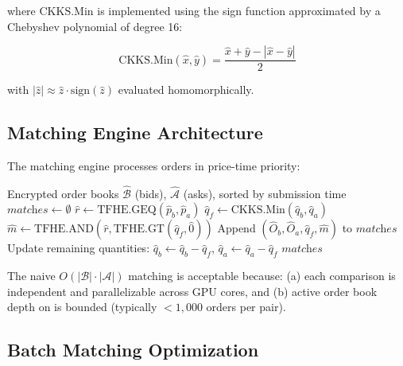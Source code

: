 where $\text{CKKS.Min}$ is implemented using the sign function approximated by a Chebyshev polynomial of degree 16:

\begin{equation}
\text{CKKS.Min}(\hat{x}, \hat{y}) = \frac{\hat{x} + \hat{y} - |\hat{x} - \hat{y}|}{2}
\end{equation}

with $|\hat{z}| \approx \hat{z} \cdot \text{sign}(\hat{z})$ evaluated homomorphically.

\subsection{Matching Engine Architecture}

The matching engine processes orders in price-time priority:

\begin{algorithm}
\caption{FHE Order Matching Engine}
\begin{algorithmic}[1]
\REQUIRE Encrypted order books $\hat{\mathcal{B}}$ (bids), $\hat{\mathcal{A}}$ (asks), sorted by submission time
\STATE $\textit{matches} \leftarrow \emptyset$
        \STATE $\hat{r} \leftarrow \text{TFHE.GEQ}(\hat{p}_b, \hat{p}_a)$ 
        \STATE $\hat{q}_f \leftarrow \text{CKKS.Min}(\hat{q}_b, \hat{q}_a)$ 
        \STATE $\hat{m} \leftarrow \text{TFHE.AND}(\hat{r}, \text{TFHE.GT}(\hat{q}_f, \hat{0}))$ 
        \STATE Append $(\hat{O}_b, \hat{O}_a, \hat{q}_f, \hat{m})$ to $\textit{matches}$
            \STATE Update remaining quantities: $\hat{q}_b \leftarrow \hat{q}_b - \hat{q}_f$, $\hat{q}_a \leftarrow \hat{q}_a - \hat{q}_f$
        \ENDIF
    \ENDFOR
\ENDFOR
\RETURN $\textit{matches}$
\end{algorithmic}
\end{algorithm}

\begin{remark}
The naive $O(|\mathcal{B}| \cdot |\mathcal{A}|)$ matching is acceptable because: (a) each comparison is independent and parallelizable across GPU cores, and (b) active order book depth on \Zoo{} \DEX{} is bounded (typically $< 1{,}000$ orders per pair).
\end{remark}

\subsection{Batch Matching Optimization}

